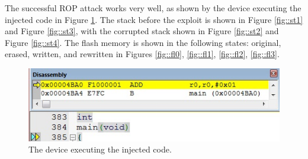 The successful ROP attack works very well, as shown by the device executing the injected code in Figure \ref{fig::ex}.  The stack before the exploit is shown in Figure \ref{fig::st1} and Figure \ref{fig::st3}, with the corrupted stack shown in Figure \ref{fig::st2} and Figure \ref{fig::st4}. The flash memory is shown in the following states: original, erased, written, and rewritten in Figures \ref{fig::fl0}, \ref{fig::fl1}, \ref{fig::fl2}, \ref{fig::fl3}. 
\begin{figure}[htbp]
	\centering
	\includegraphics[scale=0.7]{ex2}
	\caption{The device executing the injected code. }\label{fig::ex}
\end{figure}


